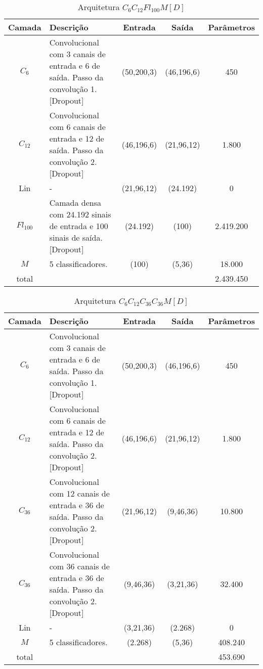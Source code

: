 \noindent
\begin{table}[!p]
	\begin{center}
		\caption{Arquitetura $C_6C_{12}Fl_{100}M[D]$}
	\end{center}
\begin{tabularx}{\linewidth}{ |c|X|c|c|c| }
	\hline
	Camada & Descrição & Entrada & Saída & Parâmetros \\ \hline \hline
	$C_{6}$ & Convolucional com 3 canais de entrada e 6 de saída. Passo da convolução 1.  [Dropout] & (50,200,3) & (46,196,6) & 450 \\ \hline
	$C_{12}$ & Convolucional com 6 canais de entrada e 12 de saída. Passo da convolução 2.  [Dropout] & (46,196,6) & (21,96,12) & 1.800 \\ \hline
	Lin & - & (21,96,12) & (24.192) & 0 \\ \hline
	$Fl_{100}$ & Camada densa com 24.192 sinais de entrada e 100 sinais de saída.  [Dropout] & (24.192) & (100) & 2.419.200 \\ \hline
	$M$ & 5 classificadores. & (100) & (5,36) & 18.000 \\ \hline
	total &  &  &  & 2.439.450 \\ \hline
\end{tabularx}
\end{table}
\noindent
\begin{table}[!p]
	\begin{center}
		\caption{Arquitetura $C_6C_{12}C_{36}C_{36}M[D]$}
	\end{center}
\begin{tabularx}{\linewidth}{ |c|X|c|c|c| }
	\hline
	Camada & Descrição & Entrada & Saída & Parâmetros \\ \hline \hline
	$C_{6}$ & Convolucional com 3 canais de entrada e 6 de saída. Passo da convolução 1.  [Dropout] & (50,200,3) & (46,196,6) & 450 \\ \hline
	$C_{12}$ & Convolucional com 6 canais de entrada e 12 de saída. Passo da convolução 2.  [Dropout] & (46,196,6) & (21,96,12) & 1.800 \\ \hline
	$C_{36}$ & Convolucional com 12 canais de entrada e 36 de saída. Passo da convolução 2.  [Dropout] & (21,96,12) & (9,46,36) & 10.800 \\ \hline
	$C_{36}$ & Convolucional com 36 canais de entrada e 36 de saída. Passo da convolução 2.  [Dropout] & (9,46,36) & (3,21,36) & 32.400 \\ \hline
	Lin & - & (3,21,36) & (2.268) & 0 \\ \hline
	$M$ & 5 classificadores. & (2.268) & (5,36) & 408.240 \\ \hline
	total &  &  &  & 453.690 \\ \hline
\end{tabularx}
\end{table}

